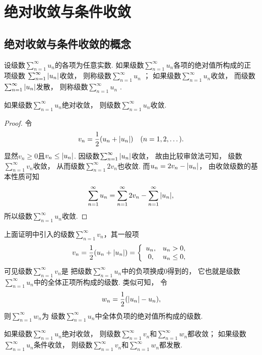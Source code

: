 \section{绝对收敛与条件收敛}
\subsection{绝对收敛与条件收敛的概念}
\begin{definition}
设级数\(\sum_{n=1}^\infty u_n\)的各项为任意实数.
如果级数\(\sum_{n=1}^\infty u_n\)各项的绝对值所构成的正项级数
\(\sum_{n=1}^\infty \abs{u_n}\)收敛，
则称级数\(\sum_{n=1}^\infty u_n\) ；
如果级数\(\sum_{n=1}^\infty u_n\)收敛，
而级数\(\sum_{n=1}^\infty \abs{u_n}\)发散，
则称级数\(\sum_{n=1}^\infty u_n\) .
\end{definition}

\begin{theorem}\label{theorem:无穷级数.绝对收敛级数必定收敛}
如果级数\(\sum_{n=1}^\infty u_n\)绝对收敛，
则级数\(\sum_{n=1}^\infty u_n\)收敛.
\begin{proof}
令\[
	v_n = \frac{1}{2} (u_n + \abs{u_n})
	\quad(n=1,2,\dotsc).
\]
显然\(v_n \geq 0\)且\(v_n \leq \abs{u_n}\).
因级数\(\sum_{n=1}^\infty \abs{u_n}\)收敛，
故由比较审敛法可知，
级数\(\sum_{n=1}^\infty v_n\)收敛，
从而级数\(\sum_{n=1}^\infty 2v_n\)也收敛.
而\(u_n = 2 v_n - \abs{u_n}\)，
由收敛级数的基本性质可知\[
	\sum_{n=1}^\infty u_n
	= \sum_{n=1}^\infty 2v_n
	- \sum_{n=1}^\infty \abs{u_n},
\]
所以级数\(\sum_{n=1}^\infty u_n\)收敛.
\end{proof}
\end{theorem}

上面证明中引入的级数\(\sum_{n=1}^\infty v_n\)，其一般项\[
	v_n = \frac{1}{2} (u_n + \abs{u_n})
	= \left\{ \begin{array}{cl}
		u_n, & u_n > 0, \\
		0, & u_n \leq 0,
	\end{array} \right.
\]
可见级数\(\sum_{n=1}^\infty v_n\)是
把级数\(\sum_{n=1}^\infty u_n\)中的负项换成\(0\)得到的，
它也就是级数\(\sum_{n=1}^\infty u_n\)中的全体正项所构成的级数.
类似可知，
令\[
	w_n = \frac{1}{2} (\abs{u_n} - u_n),
\]
则\(\sum_{n=1}^\infty w_n\)为
级数\(\sum_{n=1}^\infty u_n\)中全体负项的绝对值所构成的级数.

如果级数\(\sum_{n=1}^\infty u_n\)绝对收敛，
则级数\(\sum_{n=1}^\infty v_n\)和\(\sum_{n=1}^\infty w_n\)都收敛；
如果级数\(\sum_{n=1}^\infty u_n\)条件收敛，
则级数\(\sum_{n=1}^\infty v_n\)和\(\sum_{n=1}^\infty w_n\)都发散.

